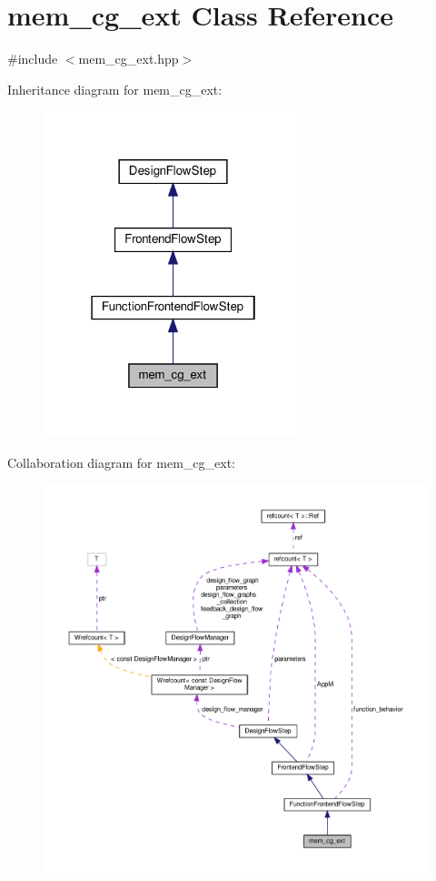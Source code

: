 \hypertarget{classmem__cg__ext}{}\section{mem\+\_\+cg\+\_\+ext Class Reference}
\label{classmem__cg__ext}


{\ttfamily \#include $<$mem\+\_\+cg\+\_\+ext.\+hpp$>$}



Inheritance diagram for mem\+\_\+cg\+\_\+ext\+:
\nopagebreak
\begin{figure}[H]
\begin{center}
\leavevmode
\includegraphics[width=214pt]{dd/dc7/classmem__cg__ext__inherit__graph}
\end{center}
\end{figure}


Collaboration diagram for mem\+\_\+cg\+\_\+ext\+:
\nopagebreak
\begin{figure}[H]
\begin{center}
\leavevmode
\includegraphics[width=350pt]{db/d20/classmem__cg__ext__coll__graph}
\end{center}
\end{figure}
